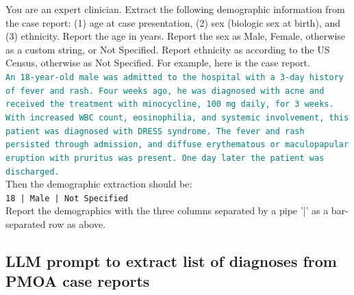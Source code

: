\begin{tcolorbox}[colback=gray!5, colframe=gray!100, title=Prompt, boxrule=2pt]
You are an expert clinician. Extract the following demographic information from the case report: (1) age at case presentation, (2) sex (biologic sex at birth), and (3) ethnicity.  Report the age in years.  Report the sex as Male, Female, otherwise as a custom string, or Not Specified.  Report ethnicity as according to the US Census, otherwise as Not Specified.  For example, here is the case report.\\

\textcolor{teal}{\texttt{An 18-year-old male was admitted to the hospital with a 3-day history of fever and rash. Four weeks ago, he was diagnosed with acne and received the treatment with minocycline, 100 mg daily, for 3 weeks. With increased WBC count, eosinophilia, and systemic involvement, this patient was diagnosed with DRESS syndrome. The fever and rash persisted through admission, and diffuse erythematous or maculopapular eruption with pruritus was present. One day later the patient was discharged.}}\\

Then the demographic extraction should be:\\
\texttt{18 | Male | Not Specified} \\
 
Report the demographics with the three columns separated by a pipe '|' as a bar-separated row as above.
\end{tcolorbox}


\subsection{LLM prompt to extract list of diagnoses from PMOA case reports}
\label{apd:diagnosis_prompt}

